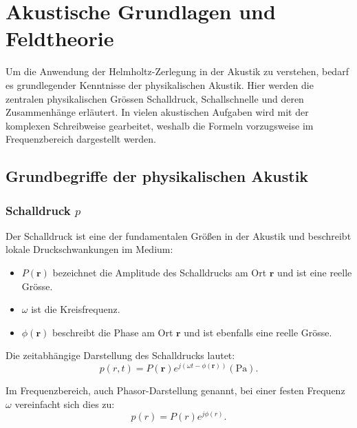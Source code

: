 %
%
%
%
\section{Akustische Grundlagen und Feldtheorie
\label{helmholtz:section:akustische_Grundlagen}}

Um die Anwendung der Helmholtz-Zerlegung in der Akustik zu verstehen, bedarf es grundlegender Kenntnisse der physikalischen Akustik.
Hier werden die zentralen physikalischen Grössen Schalldruck, Schallschnelle und deren Zusammenhänge erläutert.
In vielen akustischen Aufgaben wird mit der komplexen Schreibweise gearbeitet, weshalb die Formeln vorzugsweise im Frequenzbereich dargestellt werden.

\subsection{Grundbegriffe der physikalischen Akustik
\label{helmholtz:subsection:Grundbegriffe_Akustik}}

\subsubsection{Schalldruck $p$}
 
Der Schalldruck ist eine der fundamentalen Größen in der Akustik und beschreibt lokale Druckschwankungen im Medium:
 
\begin{itemize}
\item $P  (\boldsymbol{r})$ bezeichnet die Amplitude des Schalldrucks am Ort $\boldsymbol{r}$ und ist eine reelle Grösse.
\item $\omega$ ist die Kreisfrequenz.
\item $\phi  (\boldsymbol{r})$ beschreibt die Phase am Ort $\boldsymbol{r}$ und ist ebenfalls eine reelle Grösse.
\end{itemize}
 
Die zeitabhängige Darstellung des Schalldrucks lautet:
\begin{equation}
p(r,t) = P(\boldsymbol{r})  e^{j( \omega t - \phi(\boldsymbol{r}))} (\si{\pascal}).
\end{equation}
 
Im Frequenzbereich, auch Phasor-Darstellung genannt, bei einer festen Frequenz $\omega$ vereinfacht sich dies zu:
\begin{equation}
p(r) = P(r)  e^{j \phi (r)}.
\label{helmholtz:PhasorSchalldruck}
\end{equation}
 
